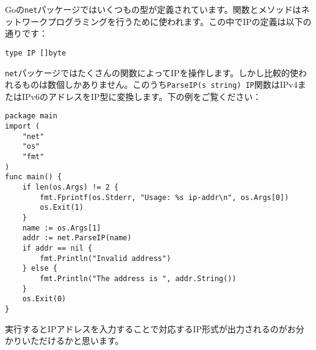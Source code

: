 Goの\texttt{net}パッケージではいくつもの型が定義されています。関数とメソッドはネットワークプログラミングを行うために使われます。この中でIPの定義は以下の通りです：

\begin{lstlisting}[numbers=none]
type IP []byte
\end{lstlisting}

\texttt{net}パッケージではたくさんの関数によってIPを操作します。しかし比較的使われるものは数個しかありません。このうち\texttt{ParseIP(s string) IP}関数はIPv4またはIPv6のアドレスをIP型に変換します。下の例をご覧ください：

\begin{lstlisting}[numbers=none]
package main
import (
    "net"
    "os"
    "fmt"
)
func main() {
    if len(os.Args) != 2 {
        fmt.Fprintf(os.Stderr, "Usage: %s ip-addr\n", os.Args[0])
        os.Exit(1)
    }
    name := os.Args[1]
    addr := net.ParseIP(name)
    if addr == nil {
        fmt.Println("Invalid address")
    } else {
        fmt.Println("The address is ", addr.String())
    }
    os.Exit(0)
}
\end{lstlisting}

実行するとIPアドレスを入力することで対応するIP形式が出力されるのがお分かりいただけるかと思います。

